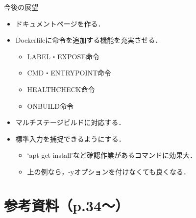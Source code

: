 \documentclass[dvipdfmx, 12pt]{beamer}
\begin{document}
\begin{frame}{今後の展望}
    \begin{itemize}
        \setlength{\itemsep}{1.0zh}
        \item ドキュメントページを作る．
        \item Dockerfileに命令を追加する機能を充実させる．
        \begin{itemize}
            \item LABEL・EXPOSE命令
            \item CMD・ENTRYPOINT命令
            \item HEALTHCHECK命令
            \item ONBUILD命令
        \end{itemize}
        \item マルチステージビルドに対応する．
        \item 標準入力を捕捉できるようにする．
        \begin{itemize}
            \item `apt-get install'など確認作業があるコマンドに効果大．
            \item 上の例なら，-yオプションを付けなくても良くなる．
        \end{itemize}
    \end{itemize}
\end{frame}






\section{参考資料（p.34〜）}
\end{document}
